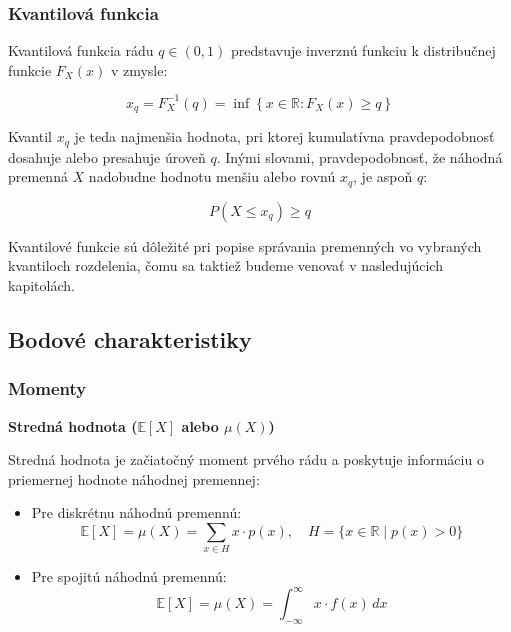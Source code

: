 \subsubsection{Kvantilová funkcia}

Kvantilová funkcia rádu $q \in (0, 1)$ predstavuje inverznú funkciu k distribučnej funkcie $F_X(x)$ v zmysle:

\begin{equation}
x_q = F_X^{-1}(q) = \inf \left\{ x \in \mathbb{R} : F_X(x) \geq q \right\}
\end{equation}

Kvantil $x_q$ je teda najmenšia hodnota, pri ktorej kumulatívna pravdepodobnosť dosahuje alebo presahuje úroveň $q$. Inými slovami, pravdepodobnosť, že náhodná premenná $X$ nadobudne hodnotu menšiu alebo rovnú $x_q$, je aspoň $q$:

\begin{equation}
P(X \leq x_q) \geq q
\end{equation}

Kvantilové funkcie sú dôležité pri popise správania premenných vo vybraných kvantiloch rozdelenia, čomu sa taktiež budeme venovať v nasledujúcich kapitolách.

\subsection{Bodové charakteristiky}\label{subsec:bodove_charakteristiky}

\subsubsection{Momenty}\label{subsubsection:momenty}

\textbf{Stredná hodnota ($\mathbb{E}[X]$ alebo $\mu(X)$)}

Stredná hodnota je začiatočný moment prvého rádu a poskytuje informáciu o priemernej hodnote náhodnej premennej:

\begin{itemize}
  \item Pre diskrétnu náhodnú premennú:
  \begin{equation}
    \mathbb{E}[X] = \mu(X) = \sum_{x \in H} x \cdot p(x), \quad H = \{ x \in \mathbb{R} \mid p(x) > 0 \}
  \end{equation}
  \item Pre spojitú náhodnú premennú:
  \begin{equation}
    \mathbb{E}[X] = \mu(X) = \int_{-\infty}^{\infty} x \cdot f(x) \, dx
  \end{equation}
\end{itemize}

